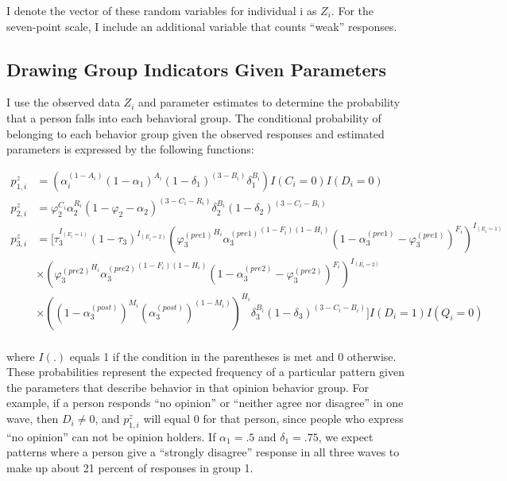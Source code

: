 \documentclass[12pt,]{article}
\begin{document}
I denote the vector of these random variables for individual i as \(Z_i\). For the seven-point scale, I include an additional variable that counts ``weak'' responses.

\hypertarget{drawing-group-indicators-given-parameters}{%
\subsection{Drawing Group Indicators Given Parameters}\label{drawing-group-indicators-given-parameters}}

I use the observed data \(Z_i\) and parameter estimates to determine the probability that a person falls into each behavioral group. The conditional probability of belonging to each behavior group given the observed responses and estimated parameters is expressed by the following functions:

\begin{align*}
p_{1,i}^z& =(\alpha_i^{(1-A_i)}(1-\alpha_1)^{A_i}(1-\delta_1)^{(3-B_i)}\delta_1^{B_i})I(C_i=0)I(D_i=0) \\
p_{2,i}^z& =\varphi_2^{C_i}\alpha_2^{R_i}(1-\varphi_2-\alpha_2)^{(3-C_i-R_i)}\delta_2^{B_i}(1-\delta_2)^{(3-C_i-B_i)} \\
p_{3,i}^z& =[\tau_3^{I_{(E_i=1)}}(1-\tau_3)^{I_{(E_i=2)}}({\varphi_3^{(pre1)}}^{H_i}{\alpha_3^{(pre1)}}^{(1-F_i)(1-H_i)}(1-\alpha_3^{(pre1)}-\varphi_3^{(pre1)})^{F_i})^{I_{(E_i=1)}} \\
&   \times ({\varphi_3^{(pre2)}}^{H_i}{\alpha_3^{(pre2)}}^{(1-F_i)(1-H_i)}(1-\alpha_3^{(pre2)}-\varphi_3^{(pre2)})^{F_i})^{I_{(E_i=2)}} \\
&   \times ((1-\alpha_3^{(post)})^{M_i}(\alpha_3^{(post)})^{(1-M_i)})^{H_i}\delta_3^{B_i}(1-\delta_3)^{(3-C_i-B_i)}]I(D_i=1)I(Q_i=0) \\
\end{align*}

where \(I(.)\) equals 1 if the condition in the parentheses is met and 0 otherwise. These probabilities represent the expected frequency of a particular pattern given the parameters that describe behavior in that opinion behavior group. For example, if a person responds ``no opinion'' or ``neither agree nor disagree'' in one wave, then \(D_i \neq 0\), and \(p_{1,i}^z\) will equal 0 for that person, since people who express ``no opinion'' can not be opinion holders. If \(\alpha_1=.5\) and \(\delta_1=.75\), we expect patterns where a person give a ``strongly disagree'' response in all three waves to make up about 21 percent of responses in group 1.
\end{document}
